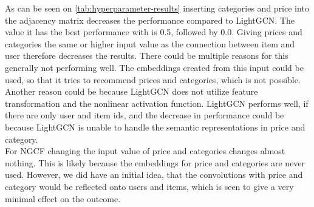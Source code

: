 As can be seen on \autoref{tab:hyperparameter-results} inserting categories and price into the adjacency matrix decreases the performance compared to LightGCN.
The value it has the best performance with is 0.5, followed by 0.0.
Giving prices and categories the same or higher input value as the connection between item and user therefore decreases the results.
There could be multiple reasons for this generally not performing well.
The embeddings created from this input could be used, so that it tries to recommend prices and categories, which is not possible.
Another reason could be because LightGCN does not utilize feature transformation and the nonlinear activation function.
LightGCN performs well, if there are only user and item ids, and the decrease in performance could be because LightGCN is unable to handle the semantic representations in price and category.\\
For NGCF changing the input value of price and categories changes almost nothing.
This is likely because the embeddings for price and categories are never used.
However, we did have an initial idea, that the convolutions with price and category would be reflected onto users and items, which is seen to give a very minimal effect on the outcome.
